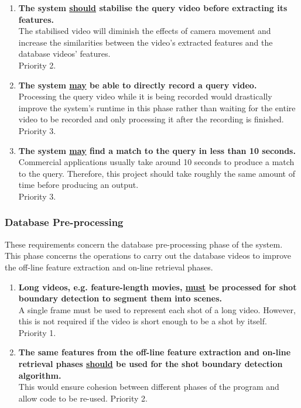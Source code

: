 \begin{enumerate}[label=F\arabic*,resume]
    \item \textbf{The system \underline{should} stabilise the query video before extracting its features.}\\
    The stabilised video will diminish the effects of camera movement and increase the similarities between the video's extracted features and the database videos' features.\\
    Priority 2.
    
    \item \textbf{The system \underline{may} be able to directly record a query video.}\\
    Processing the query video while it is being recorded would drastically improve the system's runtime in this phase rather than waiting for the entire video to be recorded and only processing it after the recording is finished.\\
    Priority 3.
    
    \item \textbf{The system \underline{may} find a match to the query in less than 10 seconds.}\\
    Commercial applications usually take around 10 seconds to produce a match to the query. Therefore, this project should take roughly the same amount of time before producing an output.\\
    Priority 3.
    
\end{enumerate}

\subsubsection{Database Pre-processing}

These requirements concern the database pre-processing phase of the system. This phase concerns the operations to carry out the database videos to improve the off-line feature extraction and on-line retrieval phases.

\begin{enumerate}[label=F\arabic*,resume]

    \item \textbf{Long videos, e.g. feature-length movies, \underline{must} be processed for shot boundary detection to segment them into scenes.}\\
    A single frame must be used to represent each shot of a long video. However, this is not required if the video is short enough to be a shot by itself.\\
    Priority 1.
    
    \item \textbf{The same features from the off-line feature extraction and on-line retrieval phases \underline{should} be used for the shot boundary detection algorithm.}\\
    This would ensure cohesion between different phases of the program and allow code to be re-used.
    Priority 2.
    
\end{enumerate}

